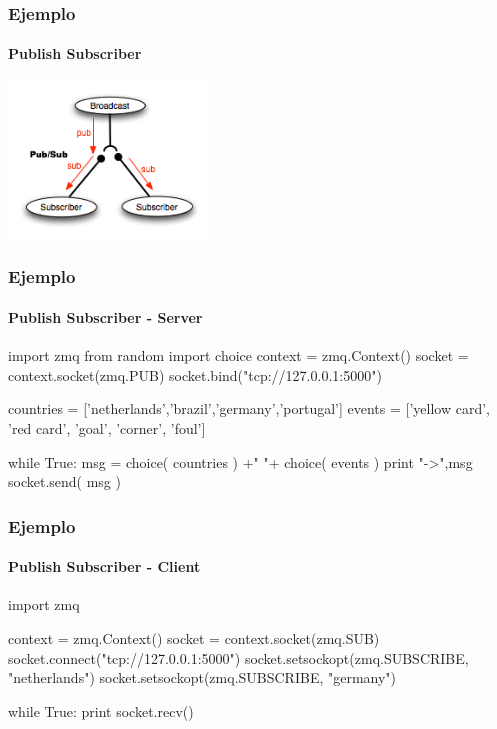 \begin{frame}
    \begin{center}
        \vspace{1cm}
            \Huge {}\\
            \Large {}
    \end{center}
\end{frame}

\begin{frame}
    \frametitle{Ejemplo}
    \framesubtitle{Publish Subscriber}
    \begin{center}
        \includegraphics[width=0.4\textwidth]{img/publish-subscriber}
    \end{center}
\end{frame}

\begin{frame}[fragile]
    \frametitle{Ejemplo}
    \framesubtitle{Publish Subscriber - Server}

    \begin{python}
        import zmq
        from random import choice
        context = zmq.Context()
        socket = context.socket(zmq.PUB)
        socket.bind("tcp://127.0.0.1:5000")
        
        countries = ['netherlands','brazil','germany','portugal']
        events = ['yellow card', 'red card', 'goal', 'corner', 'foul']
        
        while True:
            msg = choice( countries ) +" "+ choice( events )
            print "->",msg
            socket.send( msg )
    \end{python}

\end{frame}


\begin{frame}[fragile]
    \frametitle{Ejemplo}
    \framesubtitle{Publish Subscriber - Client}

    \begin{python}
        import zmq
        
        context = zmq.Context()
        socket = context.socket(zmq.SUB)
        socket.connect("tcp://127.0.0.1:5000")
        socket.setsockopt(zmq.SUBSCRIBE, "netherlands")
        socket.setsockopt(zmq.SUBSCRIBE, "germany")
        
        while True:
            print  socket.recv()
    \end{python}

\end{frame}




